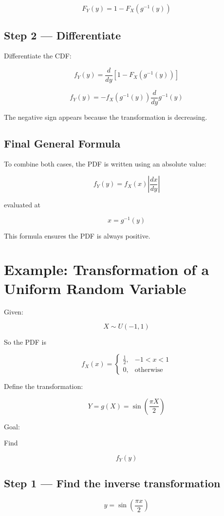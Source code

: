 \documentclass{article}
\begin{document}
\[
F_Y(y) = 1 - F_X(g^{-1}(y))
\]

\subsection*{Step 2 — Differentiate}

Differentiate the CDF:

\[
f_Y(y) = \frac{d}{dy}[1 - F_X(g^{-1}(y))]
\]

\[
f_Y(y) = -f_X(g^{-1}(y))\frac{d}{dy}g^{-1}(y)
\]

The negative sign appears because the transformation is decreasing.

\subsection*{Final General Formula}

To combine both cases, the PDF is written using an absolute value:

\[
f_Y(y) = f_X(x)\left|\frac{dx}{dy}\right|
\]

evaluated at

\[
x = g^{-1}(y)
\]

This formula ensures the PDF is always positive.

\section*{Example: Transformation of a Uniform Random Variable}

Given:

\[
X \sim U(-1,1)
\]

So the PDF is

\[
f_X(x) =
\begin{cases}
\frac{1}{2}, & -1 < x < 1 \\
0, & \text{otherwise}
\end{cases}
\]

Define the transformation:

\[
Y = g(X) = \sin\left(\frac{\pi X}{2}\right)
\]

Goal:

Find

\[
f_Y(y)
\]

\subsection*{Step 1 — Find the inverse transformation}

\[
y = \sin\left(\frac{\pi x}{2}\right)
\]
\end{document}
